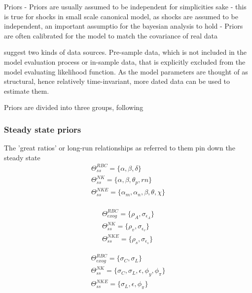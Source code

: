 \documentclass[12pt,a4paper,english]{article} %
\begin{document}
	Priors \cite{del_negro_forming_2008}
	- Priors are usually assumed to be independent for simplicities sake
	- this is true for shocks in small scale canonical model, as shocks are assumed to be independent, an important assumptio for the bayesian analysis to hold \cite{herbst_bayesian_2016}
	- Priors are often calibrated for the model to match the covariance of real data
		
	\cite{del_negro_forming_2008} suggest two kinds of data sources. Pre-sample data, which is not included in the model evaluation process or in-sample data, that is explicitly excluded from the model evaluating likelihood function.
	As the model parameters are thought of as structural, hence relatively time-invariant, more dated data can be used to estimate them. 
	
	Priors are divided into three groups, following \cite{del_negro_forming_2008}
	
	\subsubsection{Steady state priors}
	The 'great ratios' or long-run relationships as \cite{kydland_time_1982} referred to them pin down the steady state
	\begin{equation}
		\begin{aligned}
			\Theta_{ss}^{RBC} = \{ \alpha, \beta, \delta \} \\
			\Theta_{ss}^{NK} = \{\alpha, \beta, \theta_p , rn\} \\
			\Theta_{ss}^{NKE} = \{\alpha_m, \alpha_n, \beta, \theta, \chi \} \\
		\end{aligned}
	\end{equation}


	\begin{equation}
	\begin{aligned}
		\Theta_{exog}^{RBC} = \{\rho_A, \sigma_{\epsilon_A} \} \\
		\Theta_{ss}^{NK} = \{\rho_v, \sigma_{\epsilon_v} \} \\
		\Theta_{ss}^{NKE} = \{\rho_s, \sigma_{\epsilon_s} \}
	\end{aligned}
	\end{equation}

	\begin{equation}
		\begin{aligned}
			\Theta_{exog}^{RBC} = \{\sigma_C, \sigma_L \} \\
			\Theta_{ss}^{NK} = \{\sigma_C, \sigma_L, \epsilon, \phi_{y}, \phi_{\pi} \} \\
			\Theta_{ss}^{NKE} = \{\sigma_L, \epsilon, \phi_{\pi} \}
		\end{aligned}
	\end{equation}
\end{document}
